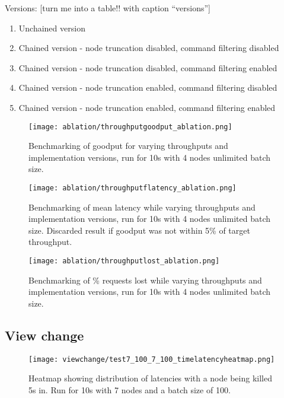 Versions:
[turn me into a table!! with caption ``versions'']
\begin{enumerate}
	\item Unchained version
	\item Chained version - node truncation disabled, command filtering disabled
	\item Chained version - node truncation disabled, command filtering enabled
	\item Chained version - node truncation enabled, command filtering disabled
	\item Chained version - node truncation enabled, command filtering enabled
\end{enumerate}

\begin{figure}[h!]
\centering
\texttt{[image: ablation/throughputgoodput\_ablation.png]}
\caption{Benchmarking of goodput for varying throughputs and implementation versions, run for 10s with 4 nodes unlimited batch size.}
\end{figure}

\begin{figure}[h!]
\centering
\texttt{[image: ablation/throughputflatency\_ablation.png]}
\caption{Benchmarking of mean latency while varying throughputs and implementation versions, run for 10s with 4 nodes unlimited batch size. Discarded result if goodput was not within 5\% of target throughput.}
\end{figure}

\begin{figure}[h!]
\centering
\texttt{[image: ablation/throughputlost\_ablation.png]}
\caption{Benchmarking of \% requests lost while varying throughputs and implementation versions, run for 10s with 4 nodes unlimited batch size.}
\end{figure}

\subsection{View change}
\begin{figure}[h!]
\centering
\texttt{[image: viewchange/test7\_100\_7\_100\_timelatencyheatmap.png]}
\caption{Heatmap showing distribution of latencies with a node being killed 5s in. Run for 10s with 7 nodes and a batch size of 100.}
\end{figure}


